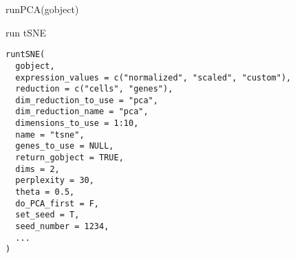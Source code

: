 \documentclass[a4paper]{book}
\begin{document}
%
\begin{Examples}
\begin{ExampleCode}
    runPCA(gobject)
\end{ExampleCode}
\end{Examples}
%
\begin{Description}\relax
run tSNE
\end{Description}
%
\begin{Usage}
\begin{verbatim}
runtSNE(
  gobject,
  expression_values = c("normalized", "scaled", "custom"),
  reduction = c("cells", "genes"),
  dim_reduction_to_use = "pca",
  dim_reduction_name = "pca",
  dimensions_to_use = 1:10,
  name = "tsne",
  genes_to_use = NULL,
  return_gobject = TRUE,
  dims = 2,
  perplexity = 30,
  theta = 0.5,
  do_PCA_first = F,
  set_seed = T,
  seed_number = 1234,
  ...
)
\end{verbatim}
\end{Usage}
%
\end{document}
